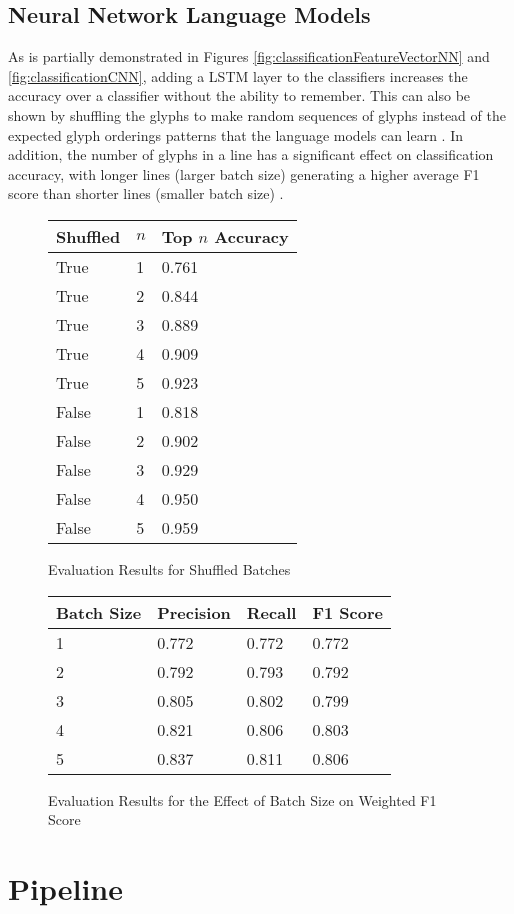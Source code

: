 \subsection{Neural Network Language Models}

As is partially demonstrated in Figures \ref{fig:classificationFeatureVectorNN} and \ref{fig:classificationCNN}, adding a LSTM layer to the classifiers increases the accuracy over a classifier without the ability to remember. This can also be shown by shuffling the glyphs to make random sequences of glyphs instead of the expected glyph orderings patterns that the language models can learn . In addition, the number of glyphs in a line has a significant effect on classification accuracy, with longer lines (larger batch size) generating a higher average F1 score than shorter lines (smaller batch size) .

\begin{figure}[H]
    \caption{Evaluation Results for Shuffled Batches}
    \label{fig:classificationShuffle}
    \centering
    \begin{tabular}{ | l | l | l | }
        \hline
        Shuffled & $n$ & Top $n$ Accuracy \\
        \hline
        True & 1 & 0.761 \\
        True & 2 & 0.844 \\
        True & 3 & 0.889 \\
        True & 4 & 0.909 \\
        True & 5 & 0.923 \\
        False & 1 & 0.818 \\
        False & 2 & 0.902 \\
        False & 3 & 0.929 \\
        False & 4 & 0.950 \\
        False & 5 & 0.959 \\
        \hline
    \end{tabular}
\end{figure}

\begin{figure}[H]
    \caption{Evaluation Results for the Effect of Batch Size on Weighted F1 Score}
    \label{fig:classificationBatchSize}
    \centering
    \begin{tabular}{ | l | l | l | l | }
        \hline
        Batch Size & Precision & Recall & F1 Score \\
        \hline
        1 & 0.772 & 0.772 & 0.772 \\
        2 & 0.792 & 0.793 & 0.792 \\
        3 & 0.805 & 0.802 & 0.799 \\
        4 & 0.821 & 0.806 & 0.803 \\
        5 & 0.837 & 0.811 & 0.806 \\
        \hline
    \end{tabular}
\end{figure}

\section{Pipeline}
